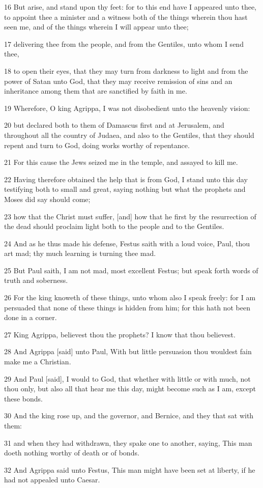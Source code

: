 \par 16 But arise, and stand upon thy feet: for to this end have I appeared unto thee, to appoint thee a minister and a witness both of the things wherein thou hast seen me, and of the things wherein I will appear unto thee;
\par 17 delivering thee from the people, and from the Gentiles, unto whom I send thee,
\par 18 to open their eyes, that they may turn from darkness to light and from the power of Satan unto God, that they may receive remission of sins and an inheritance among them that are sanctified by faith in me.
\par 19 Wherefore, O king Agrippa, I was not disobedient unto the heavenly vision:
\par 20 but declared both to them of Damascus first and at Jerusalem, and throughout all the country of Judaea, and also to the Gentiles, that they should repent and turn to God, doing works worthy of repentance.
\par 21 For this cause the Jews seized me in the temple, and assayed to kill me.
\par 22 Having therefore obtained the help that is from God, I stand unto this day testifying both to small and great, saying nothing but what the prophets and Moses did say should come;
\par 23 how that the Christ must suffer, [and] how that he first by the resurrection of the dead should proclaim light both to the people and to the Gentiles.
\par 24 And as he thus made his defense, Festus saith with a loud voice, Paul, thou art mad; thy much learning is turning thee mad.
\par 25 But Paul saith, I am not mad, most excellent Festus; but speak forth words of truth and soberness.
\par 26 For the king knoweth of these things, unto whom also I speak freely: for I am persuaded that none of these things is hidden from him; for this hath not been done in a corner.
\par 27 King Agrippa, believest thou the prophets? I know that thou believest.
\par 28 And Agrippa [said] unto Paul, With but little persuasion thou wouldest fain make me a Christian.
\par 29 And Paul [said], I would to God, that whether with little or with much, not thou only, but also all that hear me this day, might become such as I am, except these bonds.
\par 30 And the king rose up, and the governor, and Bernice, and they that sat with them:
\par 31 and when they had withdrawn, they spake one to another, saying, This man doeth nothing worthy of death or of bonds.
\par 32 And Agrippa said unto Festus, This man might have been set at liberty, if he had not appealed unto Caesar.

